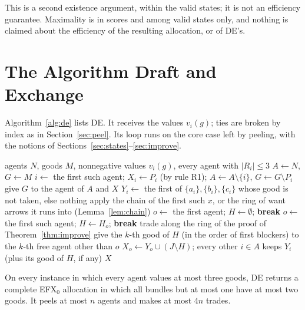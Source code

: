 \documentclass[runningheads,11pt]{llncs}
\newcommand{\efxz}{\texorpdfstring{\mbox{EFX$_0$}}{EFX0}}
\newcommand{\DE}{\textup{DE}}
\begin{document}
\noindent This is a second existence argument, within the valid states; it is not an efficiency guarantee. Maximality is in scores and among valid states only, and nothing is claimed about the efficiency of the resulting allocation, or of \DE{}'s.

\section{The Algorithm Draft and Exchange}\label{sec:algo}

Algorithm~\ref{alg:de} lists \DE{}. It receives the values $v_i(g)$; ties are broken by index as in Section~\ref{sec:peel}. Its loop runs on the core case left by peeling, with the notions of Sections~\ref{sec:states}--\ref{sec:improve}.

\begin{algorithm}[tb]
\caption{Draft and Exchange (\DE{})}\label{alg:de}
\begin{algorithmic}[1]
\Require agents $N$, goods $M$, nonnegative values $v_i(g)$, every agent with $|R_i|\le3$
\State $A\gets N$, $G\gets M$
 
  \State $i\gets$ the first such agent; $X_i\gets P_i$ (by rule R1); $A\gets A\setminus\{i\}$, $G\gets G\setminus P_i$
\EndWhile
{} give $G$ to the agent of $A$ and \Return $X$ \EndIf
{} 
  \State $Y_i\gets$ the first of $\{a_i\},\{b_i\},\{c_i\}$ whose good is not taken, else nothing
\EndFor
\Loop
   
    \State apply the chain of the first such $x$, or the ring of want arrows it runs into (Lemma~\ref{lem:chain})
   
    \State $o\gets$ the first agent; $H\gets\emptyset$; \textbf{break}
   
    \State $o\gets$ the first such agent; $H\gets H_o$; \textbf{break}
  \Else {}
    \State trade along the ring of the proof of Theorem~\ref{thm:improve}
  \EndIf
\EndLoop
\State give the $k$-th good of $H$ (in the order of first blockers) to the $k$-th free agent other than $o$
\State $X_o\gets Y_o\cup(J\setminus H)$; every other $i\in A$ keeps $Y_i$ (plus its good of $H$, if any)
\State \Return $X$
\end{algorithmic}
\end{algorithm}

\begin{theorem}[\DE{} is correct]\label{thm:de}
On every instance in which every agent values at most three goods, \DE{} returns a complete \efxz{} allocation in which all bundles but at most one have at most two goods. It peels at most $n$ agents and makes at most $4n$ trades.
\end{theorem}
\end{document}
